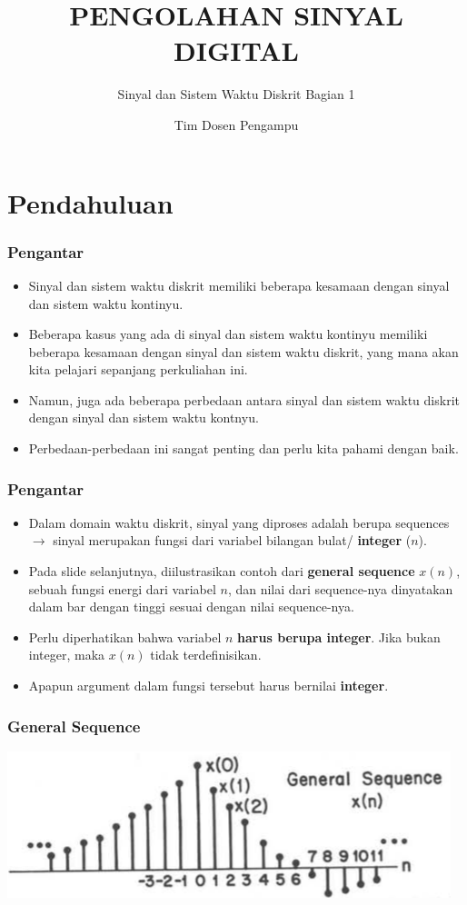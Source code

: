 \documentclass[pdflatex,compress]{beamer}
\title{PENGOLAHAN SINYAL DIGITAL}
\subtitle{Sinyal dan Sistem Waktu Diskrit Bagian 1}
\author{Tim Dosen Pengampu}
\begin{document}
\maketitle

\section{Pendahuluan}

\begin{frame}
	\frametitle{Pengantar}
	\begin{itemize}
		\item Sinyal dan sistem waktu diskrit memiliki beberapa kesamaan dengan sinyal dan sistem waktu kontinyu.
		\item Beberapa kasus yang ada di sinyal dan sistem waktu kontinyu memiliki beberapa kesamaan dengan sinyal dan sistem waktu diskrit, yang mana akan kita pelajari sepanjang perkuliahan ini.
		\item Namun, juga ada beberapa perbedaan antara sinyal dan sistem waktu diskrit dengan sinyal dan sistem waktu kontnyu.
		\item Perbedaan-perbedaan ini sangat penting dan perlu kita pahami dengan baik.
	\end{itemize}
\end{frame}

\begin{frame}
	\frametitle{Pengantar}
	\begin{itemize}
		\item Dalam domain waktu diskrit, sinyal yang diproses adalah berupa sequences $\rightarrow$ sinyal merupakan fungsi dari variabel bilangan bulat/ \textbf{integer} ($ n $).
		\item Pada slide selanjutnya, diilustrasikan contoh dari \textbf{general sequence} $ x(n) $, sebuah fungsi energi dari variabel $ n $, dan nilai dari sequence-nya dinyatakan dalam bar dengan tinggi sesuai dengan nilai sequence-nya.
		\item Perlu diperhatikan bahwa variabel $ n $ \textbf{harus berupa integer}. Jika bukan integer, maka $ x(n) $ tidak terdefinisikan.
		\item Apapun argument dalam fungsi tersebut harus bernilai \textbf{integer}.
	\end{itemize}
\end{frame}

\begin{frame}
	\frametitle{General Sequence}
	\begin{center}
		\includegraphics[width=\linewidth]{img/img001}
	\end{center}
\end{frame}
\end{document}
